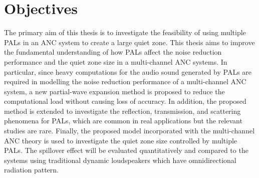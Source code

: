 
\section{Objectives}
The primary aim of this thesis is to investigate the feasibility of using multiple PALs in an ANC system to create a large quiet zone.
This thesis aims to improve the fundamental understanding of how PALs affect the noise reduction performance and the quiet zone size in a multi-channel ANC systems.
In particular, since heavy computations for the audio sound generated by PALs are required in modelling the noise reduction performance of a multi-channel ANC system, a new partial-wave expansion method is proposed to reduce the computational load without causing loss of accuracy. 
In addition, the proposed method is extended to investigate the reflection, transmission, and scattering phenomena for PALs, which are common in real applications but the relevant studies are rare.
Finally, the proposed model incorporated with the multi-channel ANC theory is used to investigate the quiet zone size controlled by multiple PALs.
The spillover effect will be evaluated quantitatively and compared to the systems using traditional dynamic loudspeakers which have omnidirectional radiation pattern.

